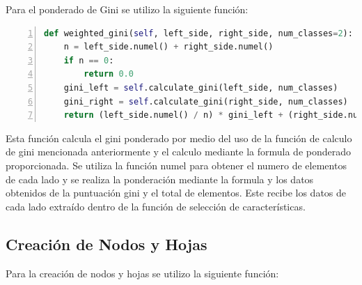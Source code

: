 \documentclass[12pt,a4paper]{article}
\begin{document}
Para el ponderado de Gini se utilizo la siguiente función:

\begin{lstlisting}[language=Python, numbers=left, basicstyle=\ttfamily\tiny,label={lst:lstlisting4}]
def weighted_gini(self, left_side, right_side, num_classes=2):
    n = left_side.numel() + right_side.numel()
    if n == 0:
        return 0.0
    gini_left = self.calculate_gini(left_side, num_classes)
    gini_right = self.calculate_gini(right_side, num_classes)
    return (left_side.numel() / n) * gini_left + (right_side.numel() / n) * gini_right
\end{lstlisting}

Esta función calcula el gini ponderado por medio del uso de la función de calculo de gini mencionada anteriormente y el calculo mediante la formula
de ponderado proporcionada.
Se utiliza la función numel para obtener el numero de elementos de cada lado y se realiza la ponderación mediante la formula y los
datos obtenidos de la puntuación gini y el total de elementos.
Este recibe los datos de cada lado extraído dentro de la función de selección de características.

\subsection{Creación de Nodos y Hojas}\label{subsec:creacion-de-nodos-y-hojas}

Para la creación de nodos y hojas se utilizo la siguiente función:
\end{document}
